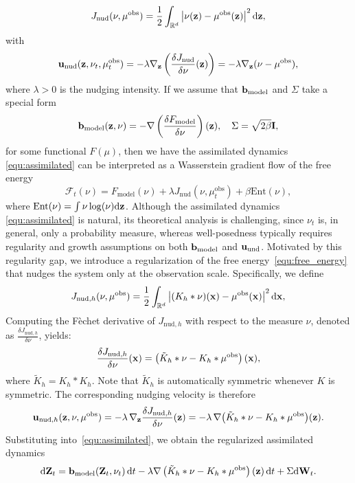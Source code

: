 \[
J_{\mathrm{nud}}(\nu,\mu^{\mathrm{obs}}) = \frac{1}{2}\int_{\mathbb{R}^d} \left| \nu(\mathbf{z}) - \mu^{\mathrm{obs}}(\mathbf{z}) \right|^2 \mathrm{d} \mathbf{z},
\]
with 
\[
\mathbf{u}_{\mathrm{nud}}(\mathbf{z},\nu_t,\mu^{\mathrm{obs}}_t) =  -\lambda \nabla_{\mathbf{z}} \left( \frac{\delta J_{\mathrm{nud}}}{\delta \nu}(\mathbf{z}) \right) = -\lambda \nabla_{\mathbf{z}} (\nu-\mu^\mathrm{obs}),
\]
where $\lambda>0$ is the nudging intensity.
If we assume that $\mathbf{b}_{\mathrm{model}}$ and $\Sigma$ take a special form $$ \mathbf{b}_{\mathrm{model}}(\mathbf{z},\nu) =  -\nabla \left( \frac{\delta F_{\mathrm{model}}}{\delta \nu}\right)(\mathbf{z}), \quad \Sigma = \sqrt{2\beta} \mathbf{I}, $$ for some functional $F(\mu)$, then we have the assimilated dynamics \eqref{equ:assimilated} can be interpreted as a Wasserstein gradient flow of the free energy 
\begin{equation}\label{equ:free_energy}
\mathcal F_t (\nu) = F_{\mathrm{model}}(\nu) + \lambda J_{\mathrm{nud}}(\nu,\mu_t^{\mathrm{obs}}) + \beta \mathrm{Ent} (\nu),
\end{equation}
where $\mathrm{Ent} (\nu) = \int \nu\log(\nu)\mathrm{d} \mathbf{z}$.
Although the assimilated dynamics \eqref{equ:assimilated} is natural, its theoretical analysis is challenging, since $\nu_t$
is, in general, only a probability measure, whereas well-posedness typically requires regularity and growth assumptions on both $\mathbf{b}_{\mathrm{model}}$ and $\mathbf{u}_{\mathrm{und}}$. Motivated by this regularity gap, we introduce a regularization of the free energy~\eqref{equ:free_energy} that nudges the system only at the
observation scale. Specifically, we define
\[
J_{\mathrm{nud},h}(\nu,\mu^{\mathrm{obs}}) = \frac{1}{2}\int_{\mathbb{R}^d} \left| (K_h*\nu)(\mathbf{x}) - \mu^{\mathrm{obs}}(\mathbf{x}) \right|^2 \mathrm{d} \mathbf{x},
\]
Computing the F\`echet derivative of $J_{\mathrm{nud},h}$ with respect to the measure $\nu$, denoted as $\frac{\delta J_{\mathrm{nud},h}}{\delta \nu}$, yields:
\[\frac{\delta J_{\mathrm{nud},h}}{\delta \nu}(\mathbf{x}) = \left( \tilde K_h * \nu - K_h* \mu^{\mathrm{obs}} \right)(\mathbf{x}),
\]
where $\tilde{K}_h = K_h * K_h$. Note that $\tilde{K}_h$ is
automatically symmetric whenever $K$ is symmetric.
The corresponding nudging velocity is therefore
\[
\mathbf{u}_{\mathrm{nud},h}(\mathbf{z}, \nu, \mu^{\mathrm{obs}})
= -\lambda\,\nabla_{\mathbf{z}} \frac{\delta J_{\mathrm{nud},h}}{\delta \nu}(\mathbf{z})
= -\lambda\,\nabla \bigl( \tilde K_h * \nu
  - K_h * \mu^{\mathrm{obs}} \bigr)(\mathbf{z}).
\]
Substituting into~\eqref{equ:assimilated}, we obtain the regularized assimilated dynamics
\begin{equation}\label{equ:assimilated_regularized}
\mathrm{d}\mathbf{Z}_t
= \mathbf{b}_{\mathrm{model}}(\mathbf{Z}_t,\nu_t)\,\mathrm{d} t -\lambda  \nabla \left( \tilde K_h * \nu - K_h * \mu^{\mathrm{obs}} \right)(\mathbf{z})\,\mathrm{d} t
+ \Sigma \mathrm{d} \mathbf{W}_t.
\end{equation}
